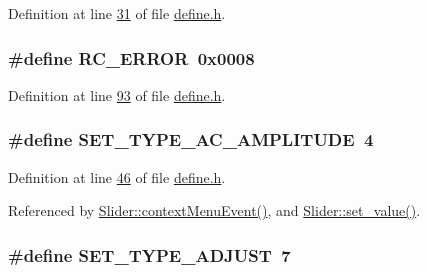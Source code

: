 Definition at line \hyperlink{a00034_source_l00031}{31} of file \hyperlink{a00034_source}{define.\+h}.

\hypertarget{a00034_a993a04d3d34ab3326d1786c66e3aaa1a}{
\subsubsection[{R\+C\+\_\+\+E\+R\+R\+O\+R}]{\setlength{\rightskip}{0pt plus 5cm}\#define R\+C\+\_\+\+E\+R\+R\+O\+R~0x0008}}\label{a00034_a993a04d3d34ab3326d1786c66e3aaa1a}


Definition at line \hyperlink{a00034_source_l00093}{93} of file \hyperlink{a00034_source}{define.\+h}.

\hypertarget{a00034_a704f34d2cc6c149f96e9da9d2a1aa8c0}{
\subsubsection[{S\+E\+T\+\_\+\+T\+Y\+P\+E\+\_\+\+A\+C\+\_\+\+A\+M\+P\+L\+I\+T\+U\+D\+E}]{\setlength{\rightskip}{0pt plus 5cm}\#define S\+E\+T\+\_\+\+T\+Y\+P\+E\+\_\+\+A\+C\+\_\+\+A\+M\+P\+L\+I\+T\+U\+D\+E~4}}\label{a00034_a704f34d2cc6c149f96e9da9d2a1aa8c0}


Definition at line \hyperlink{a00034_source_l00046}{46} of file \hyperlink{a00034_source}{define.\+h}.



Referenced by \hyperlink{a00046_source_l00309}{Slider\+::context\+Menu\+Event()}, and \hyperlink{a00046_source_l00102}{Slider\+::set\+\_\+value()}.

\hypertarget{a00034_a16b6b7b5ad68ec0dd62a3c9e97f88adb}{
\subsubsection[{S\+E\+T\+\_\+\+T\+Y\+P\+E\+\_\+\+A\+D\+J\+U\+S\+T}]{\setlength{\rightskip}{0pt plus 5cm}\#define S\+E\+T\+\_\+\+T\+Y\+P\+E\+\_\+\+A\+D\+J\+U\+S\+T~7}}\label{a00034_a16b6b7b5ad68ec0dd62a3c9e97f88adb}



